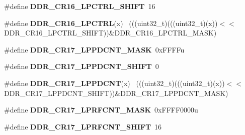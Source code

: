 \begin{DoxyCompactItemize}
\item 
\hypertarget{group___d_d_r___register___masks_ga003e46bfb62e361877abd43f03a3bdef}{}\#define {\bfseries D\+D\+R\+\_\+\+C\+R16\+\_\+\+L\+P\+C\+T\+R\+L\+\_\+\+S\+H\+I\+F\+T}~16\label{group___d_d_r___register___masks_ga003e46bfb62e361877abd43f03a3bdef}

\item 
\hypertarget{group___d_d_r___register___masks_gaaede71ad82dba0295746270b7c5b7e2b}{}\#define {\bfseries D\+D\+R\+\_\+\+C\+R16\+\_\+\+L\+P\+C\+T\+R\+L}(x)                                          ~(((uint32\+\_\+t)(((uint32\+\_\+t)(x))$<$$<$D\+D\+R\+\_\+\+C\+R16\+\_\+\+L\+P\+C\+T\+R\+L\+\_\+\+S\+H\+I\+F\+T))\&D\+D\+R\+\_\+\+C\+R16\+\_\+\+L\+P\+C\+T\+R\+L\+\_\+\+M\+A\+S\+K)\label{group___d_d_r___register___masks_gaaede71ad82dba0295746270b7c5b7e2b}

\item 
\hypertarget{group___d_d_r___register___masks_gacac624471a3d54b68194c7c249a7d670}{}\#define {\bfseries D\+D\+R\+\_\+\+C\+R17\+\_\+\+L\+P\+P\+D\+C\+N\+T\+\_\+\+M\+A\+S\+K}~0x\+F\+F\+F\+Fu\label{group___d_d_r___register___masks_gacac624471a3d54b68194c7c249a7d670}

\item 
\hypertarget{group___d_d_r___register___masks_ga140fc16e3102ef7b986e4766055c9b89}{}\#define {\bfseries D\+D\+R\+\_\+\+C\+R17\+\_\+\+L\+P\+P\+D\+C\+N\+T\+\_\+\+S\+H\+I\+F\+T}~0\label{group___d_d_r___register___masks_ga140fc16e3102ef7b986e4766055c9b89}

\item 
\hypertarget{group___d_d_r___register___masks_ga3954fde3676d44186826d83d10e34f00}{}\#define {\bfseries D\+D\+R\+\_\+\+C\+R17\+\_\+\+L\+P\+P\+D\+C\+N\+T}(x)                                        ~(((uint32\+\_\+t)(((uint32\+\_\+t)(x))$<$$<$D\+D\+R\+\_\+\+C\+R17\+\_\+\+L\+P\+P\+D\+C\+N\+T\+\_\+\+S\+H\+I\+F\+T))\&D\+D\+R\+\_\+\+C\+R17\+\_\+\+L\+P\+P\+D\+C\+N\+T\+\_\+\+M\+A\+S\+K)\label{group___d_d_r___register___masks_ga3954fde3676d44186826d83d10e34f00}

\item 
\hypertarget{group___d_d_r___register___masks_ga5343c4fe073fd94f7206486edd14fabb}{}\#define {\bfseries D\+D\+R\+\_\+\+C\+R17\+\_\+\+L\+P\+R\+F\+C\+N\+T\+\_\+\+M\+A\+S\+K}~0x\+F\+F\+F\+F0000u\label{group___d_d_r___register___masks_ga5343c4fe073fd94f7206486edd14fabb}

\item 
\hypertarget{group___d_d_r___register___masks_ga39a80320164078e57d145eb576f36e9b}{}\#define {\bfseries D\+D\+R\+\_\+\+C\+R17\+\_\+\+L\+P\+R\+F\+C\+N\+T\+\_\+\+S\+H\+I\+F\+T}~16\label{group___d_d_r___register___masks_ga39a80320164078e57d145eb576f36e9b}


\end{DoxyCompactItemize}
